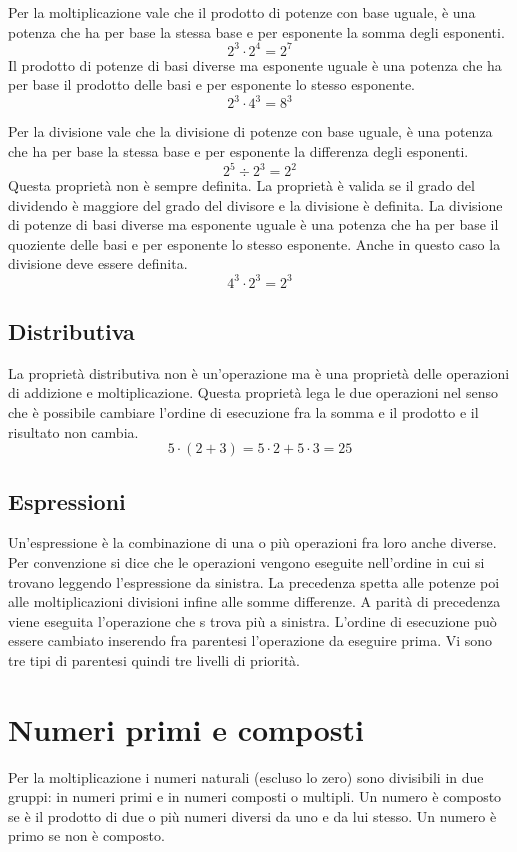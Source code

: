 Per la moltiplicazione vale che il prodotto di potenze con base uguale, è una potenza che ha per base la stessa base e per esponente la somma degli esponenti.\[ 2^3\cdot 2^4=2^7 \] Il prodotto di potenze di basi diverse ma esponente uguale è una potenza che ha per base il prodotto delle basi e per esponente lo stesso esponente.\[2^3\cdot 4^3=8^3\] 

Per la divisione vale che la divisione di potenze con base uguale, è una potenza che ha per base la stessa base e per esponente la differenza degli esponenti.\[ 2^5\div 2^3=2^2 \]Questa proprietà non è sempre definita. La proprietà è valida se il grado del dividendo è maggiore del grado del divisore e la divisione è definita.  La divisione di potenze di basi diverse ma esponente uguale è una potenza che ha per base il quoziente delle basi e per esponente lo stesso esponente. Anche in questo caso la divisione deve essere definita.\[4^3\cdot 2^3=2^3\] 
\subsection{Distributiva}
\label{sec:distibutivaInN}
La proprietà distributiva non è un'operazione ma è una proprietà delle operazioni di addizione e moltiplicazione. Questa proprietà lega le due operazioni nel senso che è possibile cambiare l'ordine di esecuzione fra la somma e il prodotto e il risultato non cambia. \[ 5\cdot(2+3)=5\cdot 2+ 5\cdot 3=25\]
\subsection{Espressioni}
\label{sec:EspressioniNumeri Naturali}
Un'espressione è la combinazione di una o più operazioni fra loro anche diverse. Per convenzione si dice che le operazioni vengono eseguite nell'ordine in cui si trovano leggendo l'espressione da sinistra. La precedenza spetta alle potenze poi alle moltiplicazioni divisioni infine alle somme differenze. A parità di precedenza viene eseguita l'operazione che s trova più a sinistra. L'ordine di esecuzione può essere  cambiato inserendo fra parentesi l'operazione da eseguire prima. Vi sono tre tipi di parentesi quindi tre livelli di priorità.
\section{Numeri primi e composti}
\label{sec:Numeriprimiecomposti}
Per la moltiplicazione i numeri naturali (escluso lo zero) sono divisibili in due gruppi: in numeri primi e in numeri composti o multipli. Un numero è composto se è il prodotto di due o più numeri diversi da uno e da lui stesso. Un numero è primo se non è composto. 

